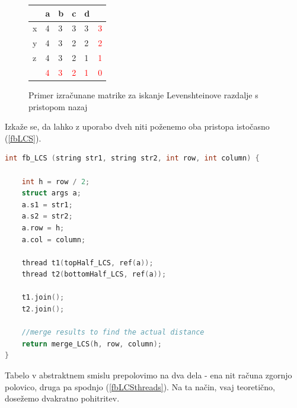 \documentclass[a4paper,12pt,openright]{book}
\begin{document}
\begin{figure}[htb]
\begin{center}
\begin{tabular}{|l|l|l|l|l|l|}
\cline{2-5}
  \multicolumn{1}{c|}{}  & a & b & c & d\\ \hline
x & \cellcolor{blue!25}4 & \cellcolor{blue!15}3 & 3 & 3 & \textcolor{red}{3}\\ \hline
y  & 4 & 3 &  \cellcolor{blue!15}2 & 2 & \textcolor{red}{2}\\ \hline
z  & 4 & 3 & 2 & \cellcolor{blue!15}1 & \textcolor{red}{1} \\ \hline
\multicolumn{1}{c|}{}  & \textcolor{red}{4} & \textcolor{red}{3} & \textcolor{red}{2} & \textcolor{red}{1} & \textcolor{red}{0} \\ \cline{2-6}
\end{tabular}

\end{center}
\caption{Primer izračunane matrike za iskanje Levenshteinove razdalje s pristopom nazaj}
\label{levenshteinBackwardExample}
\end{figure}

Izkaže se, da lahko z uporabo dveh niti poženemo oba pristopa istočasno (\ref{fbLCS}). 

\bigskip
\begin{lstlisting}[language=C++, caption={Algoritem LCS naprej-nazaj}, captionpos=b, label=fbLCS]
int fb_LCS (string str1, string str2, int row, int column) {

    int h = row / 2;
    struct args a; 
    a.s1 = str1;
    a.s2 = str2;
    a.row = h;
    a.col = column;

    thread t1(topHalf_LCS, ref(a));
    thread t2(bottomHalf_LCS, ref(a));
    
    t1.join();
    t2.join();

    //merge results to find the actual distance
    return merge_LCS(h, row, column);
}
\end{lstlisting}

Tabelo v abstraktnem smislu prepolovimo na dva dela - ena nit računa zgornjo polovico, druga pa spodnjo (\ref{fbLCSthreads}). Na ta način, vsaj teoretično, dosežemo dvakratno pohitritev. 
\end{document}
